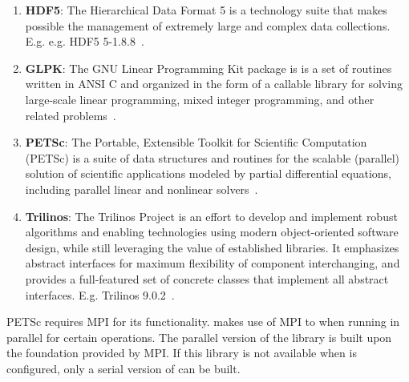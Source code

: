 \begin{enumerate}%
\item \textbf{HDF5}: The Hierarchical Data Format 5 is a technology suite that makes possible the management of extremely large and complex data collections. E.g. e.g. HDF5  5-1.8.8~\cite{HDF5}.

\item \textbf{GLPK}: The GNU Linear Programming Kit package is is a set of routines written in ANSI C and organized in the form of a callable library for solving large-scale linear programming, mixed integer programming, and other related problems~\cite{GLPK}. 

\item \textbf{PETSc}: The Portable, Extensible Toolkit for Scientific Computation (PETSc) is a suite of data structures and routines for the scalable (parallel) solution of scientific applications modeled by partial differential equations, including parallel linear and nonlinear solvers~\cite{Petsc}.

\item \textbf{Trilinos}: The Trilinos Project is an effort to develop and implement robust algorithms and enabling technologies using modern object-oriented software design, while still leveraging the value of established libraries. It emphasizes abstract interfaces for maximum flexibility of component interchanging, and provides a full-featured set of concrete classes that implement all abstract interfaces.  E.g. Trilinos 9.0.2~\cite{Trilinos}.
\end{enumerate}%

PETSc requires MPI for its functionality. \Queso makes use of MPI to when running in parallel for certain operations.
 {\color{blue}The parallel version of the library is built upon the foundation provided by MPI. If this library is not available when \Queso{} is configured, only a serial version of \Queso{} can be built.}




